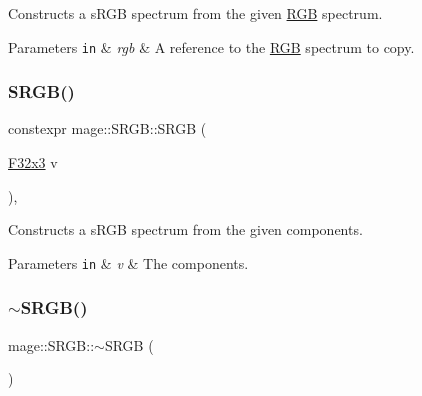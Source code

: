 Constructs a s\+R\+GB spectrum from the given \mbox{\hyperlink{structmage_1_1_r_g_b}{R\+GB}} spectrum.


\begin{DoxyParams}[1]{Parameters}
\mbox{\tt in}  & {\em rgb} & A reference to the \mbox{\hyperlink{structmage_1_1_r_g_b}{R\+GB}} spectrum to copy. \\
\hline
\end{DoxyParams}
\mbox{\label{structmage_1_1_s_r_g_b_abb02103839b539049a6dd54dd7936b16}} 
\subsubsection{\texorpdfstring{S\+R\+G\+B()}{SRGB()}\hspace{0.1cm}{\footnotesize\ttfamily [6/6]}}
{\footnotesize\ttfamily constexpr mage\+::\+S\+R\+G\+B\+::\+S\+R\+GB (\begin{DoxyParamCaption}\item[{\mbox{\hyperlink{namespacemage_a1e3c7a882af461f161caa1cbddaf1fa2}{F32x3}}}]{v }\end{DoxyParamCaption})\hspace{0.3cm}{\ttfamily [explicit]}, {\ttfamily [noexcept]}}

Constructs a s\+R\+GB spectrum from the given components.


\begin{DoxyParams}[1]{Parameters}
\mbox{\tt in}  & {\em v} & The components. \\
\hline
\end{DoxyParams}
\mbox{\label{structmage_1_1_s_r_g_b_aa5bb0738c6026da6c3e4f54869c52cbc}} 
\subsubsection{\texorpdfstring{$\sim$\+S\+R\+G\+B()}{~SRGB()}}
{\footnotesize\ttfamily mage\+::\+S\+R\+G\+B\+::$\sim$\+S\+R\+GB (\begin{DoxyParamCaption}{ }\end{DoxyParamCaption})\hspace{0.3cm}{\ttfamily [default]}}

